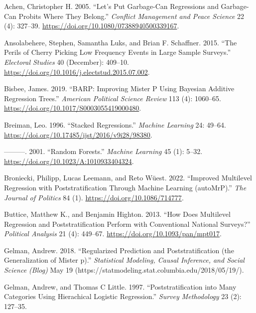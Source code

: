 \documentclass[
]{article}
\newlength{\cslhangindent}
\newlength{\cslentryspacingunit} %
\newenvironment{CSLReferences}[2] %
 {%
  \setlength{\parindent}{0pt}
  \ifodd #1
  \let\oldpar\par
  \def\par{\hangindent=\cslhangindent\oldpar}
  \fi
  \setlength{\parskip}{#2\cslentryspacingunit}
 }%
 {}
\begin{document}
\hypertarget{refs}{}
\begin{CSLReferences}{1}{0}
\leavevmode{}%
Achen, Christopher H. 2005. {``Let's Put Garbage-Can Regressions and
Garbage-Can Probits Where They Belong.''} \emph{Conflict Management and
Peace Science} 22 (4): 327--39.
\url{https://doi.org/10.1080/07388940500339167}.

\leavevmode{}%
Ansolabehere, Stephen, Samantha Luks, and Brian F. Schaffner. 2015.
{``The Perils of Cherry Picking Low Frequency Events in Large Sample
Surveys.''} \emph{Electoral Studies} 40 (December): 409--10.
\url{https://doi.org/10.1016/j.electstud.2015.07.002}.

\leavevmode{}%
Bisbee, James. 2019. {``BARP: Improving Mister P Using Bayesian Additive
Regression Trees.''} \emph{American Political Science Review} 113 (4):
1060--65. \url{https://doi.org/10.1017/S0003055419000480}.

\leavevmode{}%
Breiman, Leo. 1996. {``Stacked Regressions.''} \emph{Machine Learning}
24: 49--64. \url{https://doi.org/10.17485/ijst/2016/v9i28/98380}.

\leavevmode{}%
---------. 2001. {``Random Forests.''} \emph{Machine Learning} 45 (1):
5--32. \url{https://doi.org/10.1023/A:1010933404324}.

\leavevmode{}%
Broniecki, Philipp, Lucas Leemann, and Reto Wüest. 2022. {``Improved
Multilevel Regression with Poststratification Through Machine Learning
(autoMrP).''} \emph{The Journal of Politics} 84 (1).
\url{https://doi.org/10.1086/714777}.

\leavevmode{}%
Buttice, Matthew K., and Benjamin Highton. 2013. {``How Does Multilevel
Regression and Poststratification Perform with Conventional National
Surveys?''} \emph{Political Analysis} 21 (4): 449--67.
\url{https://doi.org/10.1093/pan/mpt017}.

\leavevmode{}%
Gelman, Andrew. 2018. {``Regularized Prediction and Poststratification
(the Generalization of Mister p).''} \emph{Statistical Modeling, Causal
Inference, and Social Science (Blog)} May 19
(https://statmodeling.stat.columbia.edu/2018/05/19/).

\leavevmode{}%
Gelman, Andrew, and Thomas C Little. 1997. {``Poststratification into
Many Categories Using Hierachical Logistic Regression.''} \emph{Survey
Methodology} 23 (2): 127--35.


\end{CSLReferences}
\end{document}
